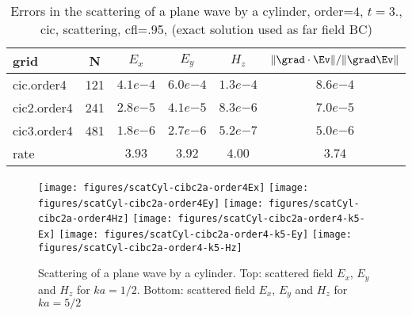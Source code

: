 \begin{table}[hbt]
\begin{center}
\begin{tabular}{|l|c|c|c|c|c|} \hline\hline 
grid  & N &  $E_x$ &  $E_y$ & $H_z$ & $\|\grad\cdot\Ev\|/\|\grad\Ev\|$\\ \hline 
cic.order4 &   121 &  $4.1e{ -4}$  &  $6.0e{ -4}$  &  $1.3e{ -4}$  &  $8.6e{ -4}$   \\ \hline
cic2.order4 &   241 &  $2.8e{ -5}$  &  $4.1e{ -5}$  &  $8.3e{ -6}$  &  $7.0e{ -5}$   \\ \hline
cic3.order4 &   481 &  $1.8e{ -6}$  &  $2.7e{ -6}$  &  $5.2e{ -7}$  &  $5.0e{ -6}$   \\ \hline
    rate            &     &       $3.93$ &       $3.92$ &       $4.00$ &       $3.74$  \\ \hline\hline
\end{tabular}
\caption{Errors in the scattering of a plane wave by a cylinder, order=$4$, $t=3.$, cic, scattering, cfl=.95, (exact solution used as far field BC)}\label{table:mx.cic}
\end{center}
\end{table}


\renewcommand{\figWidth}{.32\linewidth}
\begin{figure}
\begin{center}
\texttt{[image: figures/scatCyl-cibc2a-order4Ex]}
\texttt{[image: figures/scatCyl-cibc2a-order4Ey]}
\texttt{[image: figures/scatCyl-cibc2a-order4Hz]}
\texttt{[image: figures/scatCyl-cibc2a-order4-k5-Ex]}
\texttt{[image: figures/scatCyl-cibc2a-order4-k5-Ey]}
\texttt{[image: figures/scatCyl-cibc2a-order4-k5-Hz]}
% 
\end{center}
\caption{Scattering of a plane wave by a cylinder. Top: scattered field $E_x$, $E_y$ and $H_z$ for $k a = 1/2$.
           Bottom: scattered field $E_x$, $E_y$ and $H_z$ for $k a = 5/2$}
\end{figure}

